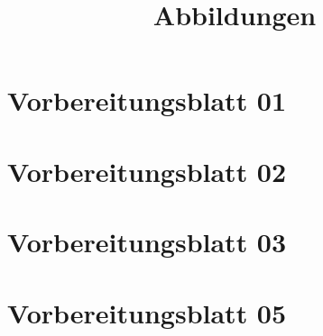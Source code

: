 \documentclass[]{uebungsblatt}
\title{Abbildungen}
\begin{document}
    \maketitle
    \makepreamble
    
    \section*{Vorbereitungsblatt 01}
    
    \section*{Vorbereitungsblatt 02}
    
    \section*{Vorbereitungsblatt 03}
    
    \section*{Vorbereitungsblatt 05}
    
    
    \newpage
    
    \begin{solutions}
        
    \end{solutions}
    
    \newpage
    
    \makehints
\end{document}
